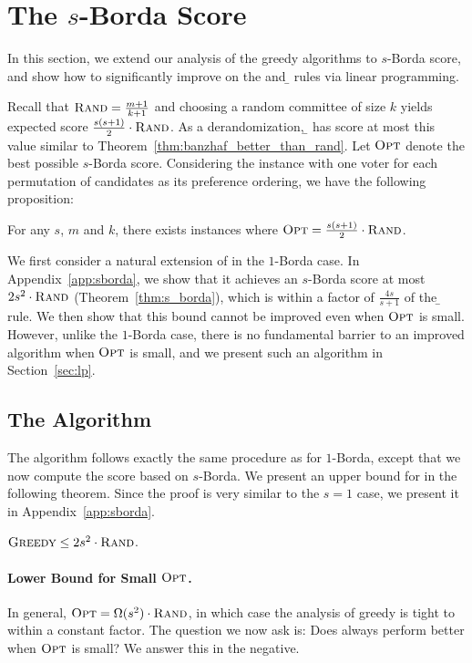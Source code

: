 \section{The $s$-Borda Score}
In this section, we extend our analysis of the greedy algorithms to $s$-Borda score, and show how to significantly improve on the \g{} and \b{} rules via linear programming. 

Recall that ${\normalfont\textsc{Rand}} = \frac{m+1}{k+1}$ and choosing a random committee of size $k$ yields expected score $\frac{s(s + 1)}{2} \cdot {\normalfont\textsc{Rand}}$. As a derandomization, \b{} has score at most this value similar to Theorem~\ref{thm:banzhaf_better_than_rand}. Let ${\normalfont\textsc{Opt}}$ denote the best possible $s$-Borda score. Considering the instance with one voter for each permutation of candidates as its preference ordering, we have the following proposition:

\begin{proposition}
For any $s$, $m$ and $k$, there exists instances where ${\normalfont\textsc{Opt}} =\frac{s(s + 1)}{2} \cdot {\normalfont\textsc{Rand}}$.
\end{proposition}

We first consider a natural extension of \g{} in the $1$-Borda case. In Appendix~\ref{app:sborda}, we show that it achieves an $s$-Borda score at most $2s^2\cdot {\normalfont\textsc{Rand}}$ (Theorem~\ref{thm:s_borda}), which is within a factor of $\frac{4s}{s + 1}$ of the \b{} rule. We then show that this bound cannot be improved even when ${\normalfont\textsc{Opt}}$ is small. However, unlike the $1$-Borda case, there is no fundamental barrier to an improved algorithm when ${\normalfont\textsc{Opt}}$ is small, and we present such an algorithm in Section~\ref{sec:lp}.

\subsection{The \g{} Algorithm} 
\label{sec:sborda_greedy}
\label{sec:sborda_g_ub}
\label{sec:sborda_g_lb}
The \g{} algorithm follows exactly the same procedure as for $1$-Borda, except that we now compute the score based on $s$-Borda. We present an upper bound for \g{} in the following theorem. Since the proof is very similar to the $s=1$ case, we present it in Appendix~\ref{app:sborda}.

\begin{theorem}
\label{thm:s_borda}
${\normalfont\textsc{Greedy}}{} \leq 2s^2\cdot {\normalfont\textsc{Rand}}$.
\end{theorem}

\paragraph{Lower Bound for Small ${\normalfont\textsc{Opt}}$.} 
In general, ${\normalfont\textsc{Opt}} = \Omega(s^2) \cdot {\normalfont\textsc{Rand}}$, in which case the analysis of greedy is tight to within a constant factor. The question we now ask is: Does \g{} always perform better when ${\normalfont\textsc{Opt}}$ is small? We answer this in the negative.

